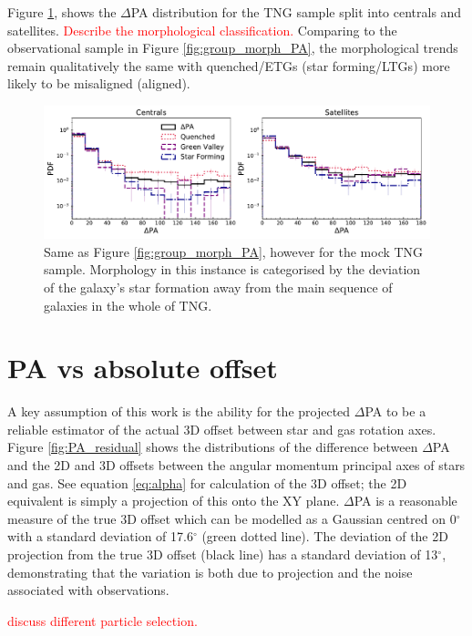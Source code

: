 \documentclass[fleqn,usenatbib]{mnras}
\newcommand{\red}[1]{{\textcolor{red}{#1}}}
\begin{document}
Figure \ref{fig:group_morph_TNG}, shows the $\Delta$PA distribution for the TNG sample split into centrals and satellites. \red{Describe the morphological classification.} Comparing to the observational sample in Figure \ref{fig:group_morph_PA}, the morphological trends remain qualitatively the same with quenched/ETGs (star forming/LTGs) more likely to be misaligned (aligned). 

\begin{figure}
	\includegraphics[width=\linewidth]{tng_appendix/TNG_delPA_sfms_group.pdf}
    \caption{Same as Figure \ref{fig:group_morph_PA}, however for the mock TNG sample. Morphology in this instance is categorised by the deviation of the galaxy's star formation away from the main sequence of galaxies in the whole of TNG.}
    \label{fig:group_morph_TNG}
\end{figure}

\section{PA vs absolute offset} \label{sec:PA_test}
A key assumption of this work is the ability for the projected $\Delta$PA to be a reliable estimator of the actual 3D offset between star and gas rotation axes. Figure \ref{fig:PA_residual} shows the distributions of the difference between $\Delta$PA and the 2D and 3D offsets between the angular momentum principal axes of stars and gas. See equation \ref{eq:alpha} for calculation of the 3D offset; the 2D equivalent is simply a projection of this onto the XY plane. $\Delta$PA is a reasonable measure of the true 3D offset which can be modelled as a Gaussian centred on 0$^{\circ}$ with a standard deviation of 17.6$^{\circ}$ (green dotted line). The deviation of the 2D projection from the true 3D offset (black line) has a standard deviation of 13$^{\circ}$, demonstrating that the variation is both due to projection and the noise associated with observations.

\red{discuss different particle selection.}
\end{document}
